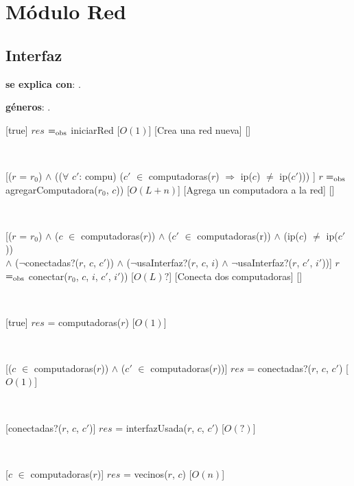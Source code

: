 \section{Módulo Red}

\subsection{Interfaz}

\textbf{se explica con}: .

\textbf{géneros}: .

  [true]
  {$res$ $=_{\mathrm{obs}}$ iniciarRed}
  [$O(1)$]
  [Crea una red nueva]
  []

  ~

  [($r$ = $r_0$) $\land$ (($\forall$ $c'$: compu) ($c'$ $\in$ computadoras($r$) $\Rightarrow$  ip($c$) $\neq$  ip($c'$)))  ]
  {$r$ $=_{\mathrm{obs}}$ agregarComputadora($r_0$, $c$)) }
  [$O(L + n)$]
  [Agrega un computadora a la red]
  []

  ~

  [($r$ = $r_0$) $\land$ ($c$ $\in$ computadoras($r$)) $\land$ ($c'$ $\in$ computadoras(r)) $\land$ (ip($c$) $\neq$ ip($c'$)) \\
   $\land$ ($\neg$conectadas?($r$, $c$, $c'$)) $\land$ ($\neg$usaInterfaz?($r$, $c$, $i$) $\land$ $\neg$usaInterfaz?($r$, $c'$, $i'$))]
  {$r$ $=_{\mathrm{obs}}$ conectar($r_0$, $c$, $i$, $c'$, $i'$))}
  [$O(L) ?$]
  [Conecta dos computadoras]
  []

  ~

  [true]  
  {$res$ = computadoras($r$)}
  [$O(1)$]

  ~

  [($c$ $\in$ computadoras($r$)) $\land$ ($c'$ $\in$ computadoras($r$))]
  {$res$ = conectadas?($r$, $c$, $c'$)}
  [$O(1)$]

  ~

  [conectadas?($r$, $c$, $c'$)]
  {$res$ = interfazUsada($r$, $c$, $c'$)}
  [$O(?)$]

  ~

  [$c$ $\in$ computadoras($r$)]
  {$res$ = vecinos($r$, $c$)}
  [$O(n)$]

